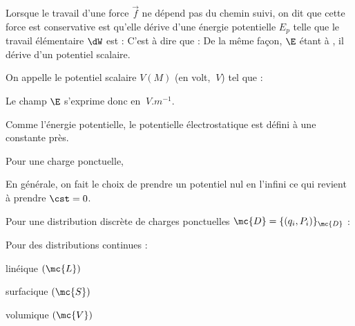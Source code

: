 \documentclass[12pt,fancy]{/Users/victor/Documents/COURS/2ACapECL/texmf/tex/latex/Preambles/cours}
\begin{document}

\noindent Lorsque le travail d'une force $\Vec{f}$ ne dépend pas du chemin suivi, on dit que cette force est conservative est qu'elle dérive d'une énergie potentielle $E_{p}$ telle que le travail élémentaire $\dW$ est :
\noindent C'est à dire que :
\noindent De la même fa\c con, $\E$ étant à , il dérive d'un potentiel scalaire. 
\begin{definition}
On appelle  le potentiel scalaire $V(M)$ (en volt, $\SI{}{V}$) tel que :
\end{definition}

\begin{remarque}
\begin{liste}
\item Le champ $\E$ s'exprime donc en $\SI{}{V.m^{-1}}$.
\item Comme l'énergie potentielle, le potentielle électrostatique est défini à une constante près.
\end{liste}
\end{remarque}


\noindent Pour une charge ponctuelle, 
\begin{remarque}
En générale, on fait le choix de prendre un potentiel nul en l'infini ce qui revient à prendre $\cst = 0$.
\end{remarque}

\noindent Pour une distribution discrète de charges ponctuelles $\mc{D} = \{(q_{i}, P_{i})\}_{\mc{D}}$ :

\noindent Pour des distributions continues :
\begin{liste}
\item linéique $(\mc{L})$ 
\item surfacique $(\mc{S})$ 
\item volumique $(\mc{V})$ 
\end{liste}
\end{document}

